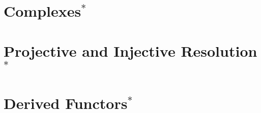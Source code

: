 \documentclass{article}
\begin{document}
\section{Complexes$^*$}



\section{Projective and Injective Resolution$^*$}

\section{Derived Functors$^*$}
\end{document}
